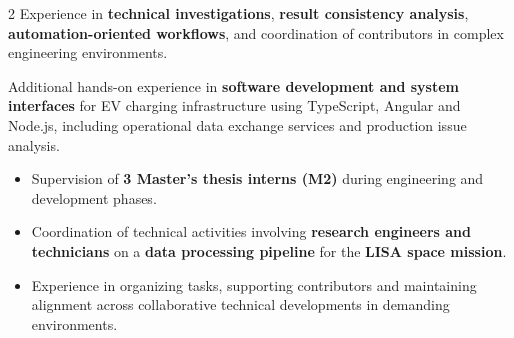\documentclass[8pt,a4paper,ragged2e,withhyper]{altacv}
\begin{document}
\begin{paracol}{2}
Experience in \textbf{technical investigations}, \textbf{result consistency analysis}, \textbf{automation-oriented workflows}, and coordination of contributors in complex engineering environments.

Additional hands-on experience in \textbf{software development and system interfaces} for EV charging infrastructure using TypeScript, Angular and Node.js, including operational data exchange services and production issue analysis.


\begin{itemize}
  \item Supervision of \textbf{3 Master’s thesis interns (M2)} during engineering and development phases.
  \item Coordination of technical activities involving \textbf{research engineers and technicians} on a \textbf{data processing pipeline} for the \textbf{LISA space mission}.
  \item Experience in organizing tasks, supporting contributors and maintaining alignment across collaborative technical developments in demanding environments.
\end{itemize}

{}
\divider

\divider


\medskip

\divider



\divider
{}
\divider
{}



\end{paracol}
\end{document}
